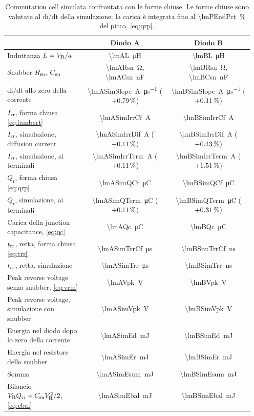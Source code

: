 \documentclass[10pt,a4paper]{scrartcl}
\let\newcommand\lmitdefine
\newcommand{\VR}{V_\mathrm{R}}
\newcommand{\Irr}{I_\mathrm{rr}}
\newcommand{\Qrr}{Q_\mathrm{rr}}
\newcommand{\trr}{t_\mathrm{rr}}
\newcommand{\Csn}{C_\mathrm{sn}}
\newcommand{\Rsn}{R_\mathrm{sn}}
\begin{document}
\begin{table}[htb]
\centering\small
\caption{Commutation cell simulata confrontata con le forme chiuse. Le forme chiuse sono valutate al di/dt della simulazione; la carica è integrata fino al \SI{\lmPEndPct}{\percent} del picco, \eqref{eq:qrp}.}
\label{tab:cell}
\begin{tabular}{@{}lcc@{}}
\toprule
 & Diodo A & Diodo B \\
\midrule
Induttanza $L = \VR/a$ & \SI{\lmAL}{\micro\henry} & \SI{\lmBL}{\micro\henry} \\
Snubber $\Rsn$, $\Csn$ & \SI{\lmARsn}{\ohm}, \SI{\lmACsn}{\nano\farad} & \SI{\lmBRsn}{\ohm}, \SI{\lmBCsn}{\nano\farad} \\
di/dt allo zero della corrente & \SI{\lmASimSlope}{\ampere\per\micro\second} ($+0.79\,\%$) & \SI{\lmBSimSlope}{\ampere\per\micro\second} ($+0.11\,\%$) \\
\addlinespace
$\Irr$, forma chiusa \eqref{eq:lambert} & \SI{\lmASimIrrCf}{\ampere} & \SI{\lmBSimIrrCf}{\ampere} \\
$\Irr$, simulazione, diffusion current & \SI{\lmASimIrrDif}{\ampere} ($-0.11\,\%$) & \SI{\lmBSimIrrDif}{\ampere} ($-0.43\,\%$) \\
$\Irr$, simulazione, ai terminali & \SI{\lmASimIrrTerm}{\ampere} ($+0.11\,\%$) & \SI{\lmBSimIrrTerm}{\ampere} ($+1.51\,\%$) \\
\addlinespace
$Q_\mathrm{r}$, forma chiusa \eqref{eq:qrp} & \SI{\lmASimQCf}{\micro\coulomb} & \SI{\lmBSimQCf}{\micro\coulomb} \\
$Q_\mathrm{r}$, simulazione, ai terminali & \SI{\lmASimQTerm}{\micro\coulomb} ($+0.11\,\%$) & \SI{\lmBSimQTerm}{\micro\coulomb} ($+0.31\,\%$) \\
Carica della junction capacitance, \eqref{eq:qc} & \SI{\lmAQc}{\micro\coulomb} & \SI{\lmBQc}{\micro\coulomb} \\
\addlinespace
$\trr$, retta, forma chiusa \eqref{eq:trr} & \SI{\lmASimTrrCf}{\micro\second} & \SI{\lmBSimTrrCf}{\nano\second} \\
$\trr$, retta, simulazione & \SI{\lmASimTrr}{\micro\second} & \SI{\lmBSimTrr}{\nano\second} \\
\addlinespace
Peak reverse voltage senza snubber, \eqref{eq:vrm} & \SI{\lmAVpk}{\volt} & \SI{\lmBVpk}{\volt} \\
Peak reverse voltage, simulazione con snubber & \SI{\lmASimVpk}{\volt} & \SI{\lmBSimVpk}{\volt} \\
Energia nel diodo dopo lo zero della corrente & \SI{\lmASimEd}{\milli\joule} & \SI{\lmBSimEd}{\milli\joule} \\
Energia nel resistore dello snubber & \SI{\lmASimEr}{\milli\joule} & \SI{\lmBSimEr}{\milli\joule} \\
Somma & \SI{\lmASimEsum}{\milli\joule} & \SI{\lmBSimEsum}{\milli\joule} \\
Bilancio $\VR\Qrr + \Csn\VR^2/2$, \eqref{eq:ebal} & \SI{\lmASimEbal}{\milli\joule} & \SI{\lmBSimEbal}{\milli\joule} \\
\bottomrule
\end{tabular}
\end{table}
\end{document}
